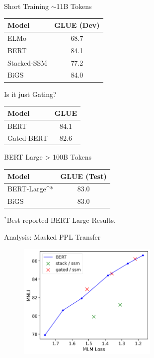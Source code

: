 \documentclass[14pt,aspectratio=169]{beamer}
\begin{document}
\begin{frame}{Short Training $\sim$11B Tokens}
    \begin{table}
    \begin{tabular}{lc}
        \toprule
        Model & GLUE (Dev)\\
        \midrule 
         ELMo & 68.7 \\
         BERT &  84.1\\ 
         Stacked-SSM & 77.2 \\ 
         BiGS & 84.0 \\
        \bottomrule
    \end{tabular}
    \end{table}
\end{frame}

\begin{frame}{Is it just Gating?}
    \begin{table}
    \begin{tabular}{lc}
        \toprule
        Model & GLUE \\
        \midrule 
         BERT &  84.1\\ 
         Gated-BERT &  82.6 \\ 
        \bottomrule
    \end{tabular}
    \end{table}
\end{frame}


\begin{frame}{BERT Large > 100B Tokens}
    \begin{table}
    \begin{tabular}{lc}
        \toprule
        Model & GLUE (Test)\\
        \midrule 
         BERT-Large^* &  83.0\\ 
         BiGS & 83.0 \\
        \bottomrule
    \end{tabular}
    \end{table}
    \centerline{$^*$Best reported BERT-Large Results.}
\end{frame}

\begin{frame}{Analysis: Masked PPL Transfer}
    \begin{figure}
    \centering
    \includegraphics[width=0.6\textwidth]{Figs/MNLI.png}
\end{figure}
\end{frame}
\end{document}
